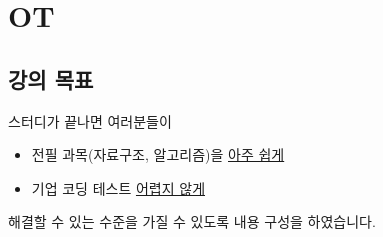 \section{OT}

\subsection{강의 목표}
\begin{frame}{\textbf{\currentname}}
    스터디가 끝나면 여러분들이

    \begin{itemize}
        \item 전필 과목(자료구조, 알고리즘)을 \underline{아주 쉽게}
        \item 기업 코딩 테스트 \underline{어렵지 않게}
    \end{itemize}

    해결할 수 있는 수준을 가질 수 있도록 내용 구성을 하였습니다.
\end{frame}

